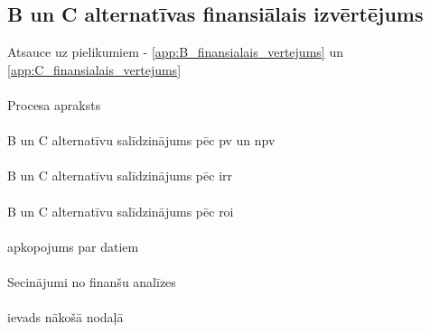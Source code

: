 \subsection{B un C alternatīvas finansiālais izvērtējums}
Atsauce uz pielikumiem - \ref{app:B_finansialais_vertejums} un \ref{app:C_finansialais_vertejums}
\paragraph{}
Procesa apraksts
\paragraph{}
B un C alternatīvu salīdzinājums pēc \gls{pv} un \gls{npv}
\paragraph{}
B un C alternatīvu salīdzinājums pēc \gls{irr}
\paragraph{}
B un C alternatīvu salīdzinājums pēc \gls{roi}
\paragraph{}
apkopojums par datiem
\paragraph{}
Secinājumi no finanšu analīzes
\paragraph{}
ievads nākošā nodaļā
